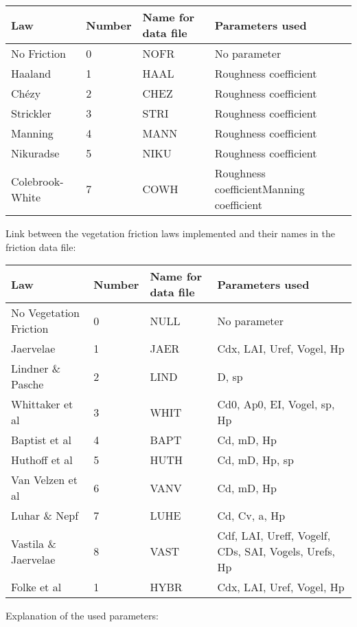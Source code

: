 \begin{tabular}{|p{1.0in}|p{0.5in}|p{0.8in}|p{1.0in}|} \hline
Law &  Number & Name for data file & Parameters used \\ \hline
No Friction & 0 & NOFR & No parameter \\ \hline
Haaland & 1 & HAAL & Roughness coefficient \\ \hline
Ch\'{e}zy & 2 & CHEZ & Roughness coefficient \\ \hline
Strickler & 3 & STRI & Roughness coefficient \\ \hline
Manning & 4 & MANN & Roughness coefficient \\ \hline
Nikuradse & 5 & NIKU & Roughness coefficient \\ \hline
Colebrook-White & 7 & COWH & Roughness coefficient\newline Manning coefficient \\ \hline
\end{tabular}



Link between the vegetation friction laws implemented and their names in the friction data file:

\begin{tabular}{|p{1.0in}|p{0.5in}|p{0.8in}|p{1.0in}|} \hline
 Law &  Number & Name for data file & Parameters used \\ \hline
No Vegetation Friction & 0 & NULL & No parameter \\ \hline
Jaervelae & 1 & JAER & Cdx, LAI, Uref, Vogel, Hp \\ \hline
Lindner \& Pasche& 2 & LIND & D, sp \\ \hline
Whittaker et al & 3 & WHIT & Cd0, Ap0, EI, Vogel, sp, Hp \\ \hline
Baptist et al & 4 & BAPT & Cd, mD, Hp \\ \hline
Huthoff et al & 5 & HUTH & Cd, mD, Hp, sp \\ \hline
Van Velzen et al & 6 & VANV & Cd, mD, Hp \\ \hline
Luhar \& Nepf & 7 & LUHE & Cd, Cv, a, Hp \\ \hline
Vastila \& Jaervelae & 8 & VAST & Cdf, LAI, Ureff, Vogelf, CDs,  SAI, Vogels, Urefs, Hp \\ \hline
Folke et al & 1 & HYBR & Cdx, LAI, Uref, Vogel, Hp \\ \hline
\end{tabular}

Explanation of the used parameters: 

